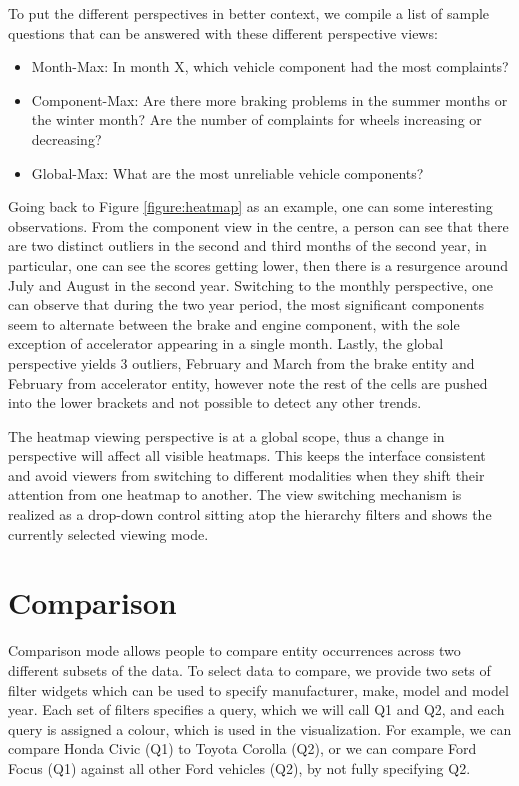To put the different perspectives in better context, we compile a list of sample 
questions that can be answered with these different perspective views:
\begin{itemize} [noitemsep]
  \item Month-Max: In month X, which vehicle component had the most complaints?
  \item Component-Max: Are there more braking problems in the summer months or
  the winter month? Are the number of complaints for wheels increasing or
  decreasing?
  \item Global-Max: What are the most unreliable vehicle components?
\end{itemize}

Going back to Figure \ref{figure:heatmap} as an example, one can some
interesting observations. From the component view in the centre, a person can
see that there are two distinct outliers in the second and third months of the
second year, in particular, one can see the scores getting lower, then there is
a resurgence around July and August in the second year. Switching to the monthly
perspective, one can observe that during the two year period, the most
significant components seem to alternate between the brake and engine component,
with the sole exception of accelerator appearing in a single month. Lastly, the
global perspective yields 3 outliers, February and March from the brake entity
and February from accelerator entity, however note the rest of the cells are
pushed into the lower brackets and not possible to detect any other trends.
 
The heatmap viewing perspective is at a global scope, thus a change in
perspective will affect all visible heatmaps. This keeps the interface
consistent and avoid viewers from switching to different modalities when they
shift their attention from one heatmap to another. The view switching mechanism
is realized as a drop-down control sitting atop the hierarchy filters and shows
the currently selected viewing mode.



\section{Comparison}
Comparison mode allows people to compare entity occurrences across
two different subsets of the data. To select data to compare, we provide
two sets of filter widgets which can be used to specify manufacturer,
make, model and model year. Each set of filters specifies a query,
which we will call Q1 and Q2, and each query is assigned a colour,
which is used in the visualization. For example, we can compare
Honda Civic (Q1) to Toyota Corolla (Q2), or we can compare Ford
Focus (Q1) against all other Ford vehicles (Q2), by not fully specifying Q2.

